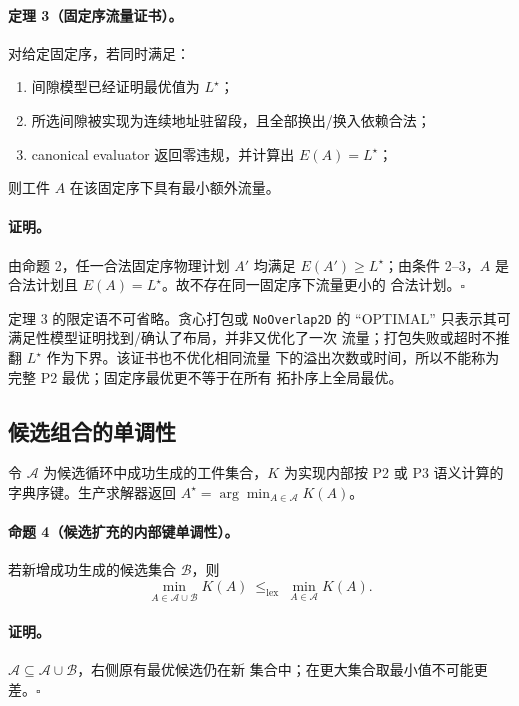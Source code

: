 \paragraph{定理 3（固定序流量证书）。}
对给定固定序，若同时满足：
\begin{enumerate}
  \item 间隙模型已经证明最优值为 $L^\star$；
  \item 所选间隙被实现为连续地址驻留段，且全部换出/换入依赖合法；
  \item canonical evaluator 返回零违规，并计算出 $E(A)=L^\star$；
\end{enumerate}
则工件 $A$ 在该固定序下具有最小额外流量。

\paragraph{证明。}
由命题 2，任一合法固定序物理计划 $A'$ 均满足 $E(A')\ge L^\star$；由条件
2--3，$A$ 是合法计划且 $E(A)=L^\star$。故不存在同一固定序下流量更小的
合法计划。\hfill$\square$

定理 3 的限定语不可省略。贪心打包或 \texttt{NoOverlap2D} 的
``OPTIMAL'' 只表示其可满足性模型证明找到/确认了布局，并非又优化了一次
流量；打包失败或超时不推翻 $L^\star$ 作为下界。该证书也不优化相同流量
下的溢出次数或时间，所以不能称为完整 P2 最优；固定序最优更不等于在所有
拓扑序上全局最优。

\subsection{候选组合的单调性}

令 $\mathcal A$ 为候选循环中成功生成的工件集合，$K$ 为实现内部按 P2 或
P3 语义计算的字典序键。生产求解器返回
$A^\star=\arg\min_{A\in\mathcal A}K(A)$。

\paragraph{命题 4（候选扩充的内部键单调性）。}
若新增成功生成的候选集合 $\mathcal B$，则
\begin{equation}
 \min_{A\in\mathcal A\cup\mathcal B}K(A)
 \ \le_{\mathrm{lex}}\
 \min_{A\in\mathcal A}K(A).
\end{equation}

\paragraph{证明。}
$\mathcal A\subseteq\mathcal A\cup\mathcal B$，右侧原有最优候选仍在新
集合中；在更大集合取最小值不可能更差。\hfill$\square$

